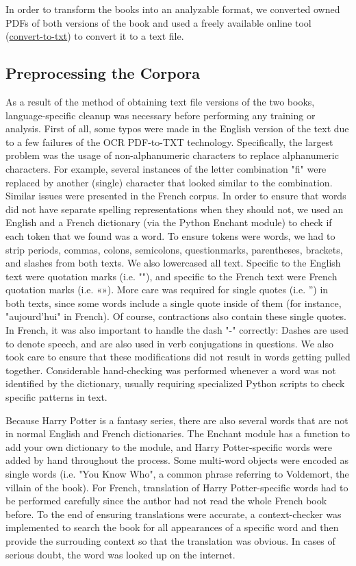 \documentclass[12pt, usenames]{article}
\theoremstyle{definition}
\theoremstyle{definition}
\theoremstyle{definition}
\begin{document}
In order to transform the books into an analyzable format, we converted owned PDFs of both versions of the book and used a freely available online tool (\href{http://document.online-convert.com/convert-to-txt}{convert-to-txt}) to convert it to a text file.

\subsection{Preprocessing the Corpora} 

As a result of the method of obtaining text file versions of the two books, language-specific cleanup was necessary before performing any training or analysis. First of all, some typos were made in the English version of the text due to a few failures of the OCR PDF-to-TXT technology. Specifically, the largest problem was the usage of non-alphanumeric characters to replace alphanumeric characters. For example, several instances of the letter combination "fi" were replaced by another (single) character that looked similar to the combination. Similar issues were presented in the French corpus. In order to ensure that words did not have separate spelling representations when they should not, we used an English and a French dictionary (via the Python Enchant module) to check if each token that we found was a word. To ensure tokens were words, we had to strip periods, commas, colons, semicolons, questionmarks, parentheses, brackets, and slashes from both texts. We also lowercased all text. Specific to the English text were quotation marks (i.e. ""), and specific to the French text were French quotation marks (i.e. «»). More care was required for single quotes (i.e. '') in both texts, since some words include a single quote inside of them (for instance, "aujourd'hui" in French). Of course, contractions also contain these single quotes. In French, it was also important to handle the dash "-" correctly: Dashes are used to denote speech, and are also used in verb conjugations in questions. We also took care to ensure that these modifications did not result in words getting pulled together. Considerable hand-checking was performed whenever a word was not identified by the dictionary, usually requiring specialized Python scripts to check specific patterns in text. 

Because Harry Potter is a fantasy series, there are also several words that are not in normal English and French dictionaries. The Enchant module has a function to add your own dictionary to the module, and Harry Potter-specific words were added by hand throughout the process. Some multi-word objects were encoded as single words (i.e. "You Know Who", a common phrase referring to Voldemort, the villain of the book). For French, translation of Harry Potter-specific words had to be performed carefully since the author had not read the whole French book before. To the end of ensuring translations were accurate, a context-checker was implemented to search the book for all appearances of a specific word and then provide the surrouding context so that the translation was obvious. In cases of serious doubt, the word was looked up on the internet.
\end{document}
